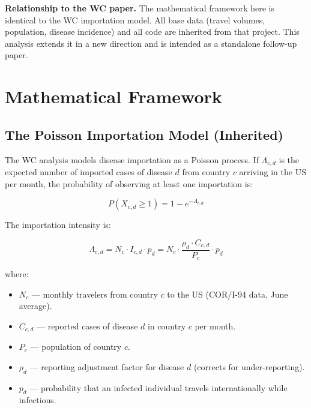 \documentclass[12pt]{article}
\begin{document}
\textbf{Relationship to the WC paper.} The mathematical framework
here is identical to the WC importation model. All base data
(travel volumes, population, disease incidence) and all code are
inherited from that project. This analysis extends it in a new
direction and is intended as a standalone follow-up paper.

\section{Mathematical Framework}

\subsection{The Poisson Importation Model (Inherited)}

The WC analysis models disease importation as a Poisson process.
If $\Lambda_{c,d}$ is the expected number of imported cases of
disease $d$ from country $c$ arriving in the US per month, the
probability of observing at least one importation is:

\begin{equation}
  P(X_{c,d} \geq 1) = 1 - e^{-\Lambda_{c,d}}
  \label{eq:poisson}
\end{equation}

The importation intensity is:

\begin{equation}
  \Lambda_{c,d} = N_c \cdot I_{c,d} \cdot p_d
  = N_c \cdot \frac{\rho_d \cdot C_{c,d}}{P_c} \cdot p_d
  \label{eq:lambda}
\end{equation}

where:
\begin{itemize}
  \item $N_c$ --- monthly travelers from country $c$ to the US
        (COR/I-94 data, June average).
  \item $C_{c,d}$ --- reported cases of disease $d$ in country $c$
        per month.
  \item $P_c$ --- population of country $c$.
  \item $\rho_d$ --- reporting adjustment factor for disease $d$
        (corrects for under-reporting).
  \item $p_d$ --- probability that an infected individual travels
        internationally while infectious.
\end{itemize}
\end{document}
